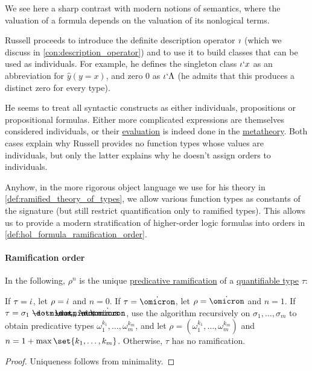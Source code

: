 \begin{remark}
\begin{thmenum}
    We see here a sharp contrast with modern notions of semantics, where the valuation of a formula depends on the valuation of its nonlogical terms.

    Russell proceeds to introduce the definite description operator \( \rotiota \) (which we discuss in \cref{con:description_operator}) and to use it to build classes that can be used as individuals. For example, he defines the singleton class \( \iota\text{\lq} x \) as an abbreviation for \( \hat y (y = x) \), and zero \( 0 \) as \( \iota\text{\lq} \Lambda \) (he admits that this produces a distinct zero for every type).

    He seems to treat all syntactic constructs as either individuals, propositions or propositional formulas. Either more complicated expressions are themselves considered individuals, or their \hyperref[con:evaluation]{evaluation} is indeed done in the \hyperref[con:metalogic]{metatheory}. Both cases explain why Russell provides no function types whose values are individuals, but only the latter explains why he doesn't assign orders to individuals.

    Anyhow, in the more rigorous object language we use for his theory in \cref{def:ramified_theory_of_types}, we allow various function types as constants of the signature (but still restrict quantification only to ramified types). This allows us to provide a modern stratification of higher-order logic formulas into orders in \cref{def:hol_formula_ramification_order}.
  \end{thmenum}
\end{remark}

\paragraph{Ramification order}

\begin{proposition}\label{thm:predicative_ramification_of_type}
  In the following, \( \rho^n \) is the unique \hyperref[def:ramified_theory_of_types/predicative]{predicative ramification} of a \hyperref[def:hol_signature/universes/quant]{quantifiable type} \( \tau \):
  \begin{thmenum}
     If \( \tau = \dot{\iota} \), let \( \rho = \dot{\iota} \) and \( n = 0 \).
     If \( \tau = \syn\omicron \), let \( \rho = \syn\omicron \) and \( n = 1 \).
     If \( \tau = \sigma_1 \synimplies \cdots \synimplies \sigma_m \synimplies \syn\omicron \), use the algorithm recursively on \( \sigma_1, \ldots, \sigma_m \) to obtain predicative types \( \omega_1^{k_1}, \ldots, \omega_m^{k_m} \), and let \( \rho = (\omega_1^{k_1}, \ldots, \omega_m^{k_m}) \) and \( n = 1 + \max\set{ k_1, \ldots, k_m } \).
     Otherwise, \( \tau \) has no ramification.
  \end{thmenum}
\end{proposition}
\begin{proof}
  Uniqueness follows from minimality.
\end{proof}

